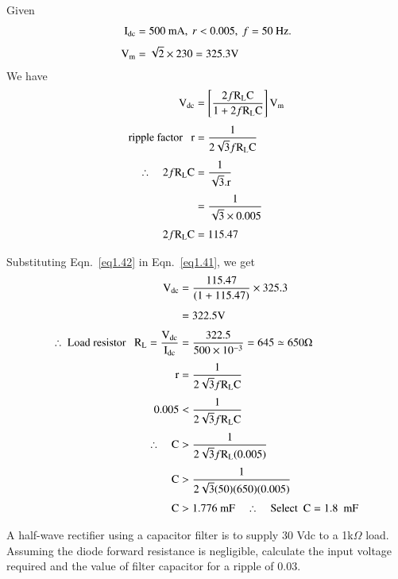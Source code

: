 \begin{solution}
Given
\begin{align*}
\rmI_{\text{dc}} &= 500 \text{~mA}, \ r<0.005, \ f=50\text{~Hz}.\\[3pt]
\rmV_{\rmm} &= \sqrt{2}\times 230=325.3\rmV
\end{align*}
We have
\begin{align}
\textrm{V}_{\text{dc}} &= \left[\frac{2f\textrm{R}_{\textrm{L}}\textrm{C}}{1+2f\textrm{R}_{\textrm{L}}\textrm{C}}\right]\textrm{V}_{\textrm{m}}\label{eq1.41}\\[4pt]
\text{ripple factor~~ } \textrm{r} &= \frac{1}{2\sqrt{3}f\textrm{R}_{\textrm{L}}\textrm{C}}\notag\\[3pt]
\therefore\quad 2f\textrm{R}_{\textrm{L}}\textrm{C} &= \frac{1}{\sqrt{3}.\textrm{r}}\notag\\[3pt]
 &= \frac{1}{\sqrt{3}\times 0.005}\notag\\[3pt]
2f\textrm{R}_{\textrm{L}}\textrm{C} &= 115.47\label{eq1.42}
\end{align}

Substituting Eqn.~\eqref{eq1.42} in Eqn.~\eqref{eq1.41}, we get
\begin{align*}
\textrm{V}_{\text{dc}} &= \frac{115.47}{(1+115.47)}\times 325.3\\[4pt]
&= 322.5\textrm{V}\\[3pt]
\therefore~ \text{Load resistor~~ } \textrm{R}_{\textrm{L}} = \frac{\textrm{V}_{\text{dc}}}{\textrm{I}_{\text{dc}}} &= \frac{322.5}{500\times 10^{-3}}=645\simeq 650\Omega\\[3pt]
\textrm{r} &= \frac{1}{2\sqrt{3}f\textrm{R}_{\textrm{L}}\textrm{C}}\\[3pt]
0.005 &< \frac{1}{2\sqrt{3}f\textrm{R}_{\textrm{L}}\textrm{C}}\\[3pt]
\therefore\quad \textrm{C} &> \frac{1}{2\sqrt{3}f\textrm{R}_{\textrm{L}}(0.005)}\\[3pt]
\textrm{C} &> \frac{1}{2\sqrt{3}(50)(650)(0.005)}\\[3pt]
\textrm{C} &> 1.776\text{~mF}\quad\therefore\quad \text{Select~ } \textrm{C}=1.8\text{~ mF}
\end{align*}
\end{solution}

\begin{problem}\label{prob1.18}
A half-wave rectifier using a capacitor filter is to supply 30 Vdc to a 1k$\Omega$ load. Assuming the diode forward resistance is negligible, calculate the input voltage required and the value of filter capacitor for a ripple of 0.03.
\end{problem}

